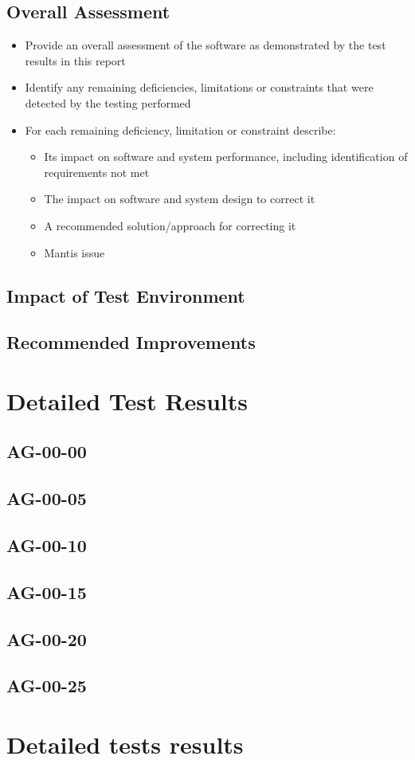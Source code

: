 \documentclass[DM,lsstdraft,STR,toc]{lsstdoc}
\begin{document}
\subsection{Overall Assessment \label{sect:overallassessment}}
\begin{itemize}
\item Provide an overall assessment of the software as demonstrated by the test results in this report
\item Identify any remaining deficiencies, limitations or constraints that were detected by the testing performed
\item For each remaining deficiency, limitation or constraint describe:
\begin{itemize}
\item Its impact on software and system performance, including identification of requirements not met
\item The impact on software and system design to correct it
\item A recommended solution/approach for correcting it
\item Mantis issue
\end{itemize}
\end{itemize}

\subsection{Impact of Test Environment}
\label{sect:impact}

\subsection{Recommended Improvements}
\label{sect:recommendations}


\section{Detailed Test Results}
\label{sect:detailed}

\subsection{AG-00-00}
\subsection{AG-00-05}
\subsection{AG-00-10}
\subsection{AG-00-15}
\subsection{AG-00-20}
\subsection{AG-00-25}

\appendix

\newpage
\section{Detailed tests results}
\end{document}
